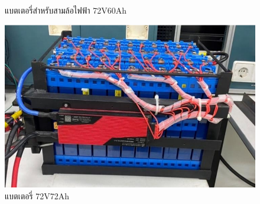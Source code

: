 \begin{center}
\begin{figure}[H]
		\caption{แบตเตอรี่สำหรับสามล้อไฟฟ้า 72V60Ah}
	\end{figure}
	\begin{figure}[H]
		\includegraphics[width=0.5\linewidth]{Chapters/img/Battery_72V72Ah.jpg}
		\centering
		\captionsetup{justification=centering,margin=2cm}
		\caption{แบตเตอรี่ 72V72Ah}
	\end{figure}
\end{center}
